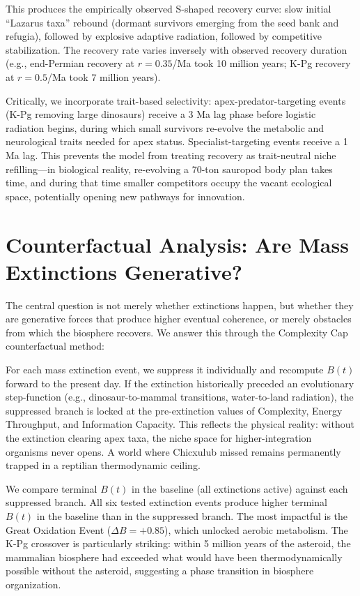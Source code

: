 This produces the empirically observed S-shaped recovery curve: slow initial ``Lazarus taxa'' rebound (dormant survivors emerging from the seed bank and refugia), followed by explosive adaptive radiation, followed by competitive stabilization. The recovery rate varies inversely with observed recovery duration (e.g., end-Permian recovery at $r = 0.35$/Ma took 10 million years; K-Pg recovery at $r = 0.5$/Ma took 7 million years).

Critically, we incorporate trait-based selectivity: apex-predator-targeting events (K-Pg removing large dinosaurs) receive a 3 Ma lag phase before logistic radiation begins, during which small survivors re-evolve the metabolic and neurological traits needed for apex status. Specialist-targeting events receive a 1 Ma lag. This prevents the model from treating recovery as trait-neutral niche refilling---in biological reality, re-evolving a 70-ton sauropod body plan takes time, and during that time smaller competitors occupy the vacant ecological space, potentially opening new pathways for innovation.

\section{Counterfactual Analysis: Are Mass Extinctions Generative?}

The central question is not merely whether extinctions happen, but whether they are generative forces that produce higher eventual coherence, or merely obstacles from which the biosphere recovers. We answer this through the Complexity Cap counterfactual method:

For each mass extinction event, we suppress it individually and recompute $B(t)$ forward to the present day. If the extinction historically preceded an evolutionary step-function (e.g., dinosaur-to-mammal transitions, water-to-land radiation), the suppressed branch is locked at the pre-extinction values of Complexity, Energy Throughput, and Information Capacity. This reflects the physical reality: without the extinction clearing apex taxa, the niche space for higher-integration organisms never opens. A world where Chicxulub missed remains permanently trapped in a reptilian thermodynamic ceiling.

We compare terminal $B(t)$ in the baseline (all extinctions active) against each suppressed branch. All six tested extinction events produce higher terminal $B(t)$ in the baseline than in the suppressed branch. The most impactful is the Great Oxidation Event ($\Delta B = +0.85$), which unlocked aerobic metabolism. The K-Pg crossover is particularly striking: within 5 million years of the asteroid, the mammalian biosphere had exceeded what would have been thermodynamically possible without the asteroid, suggesting a phase transition in biosphere organization.

